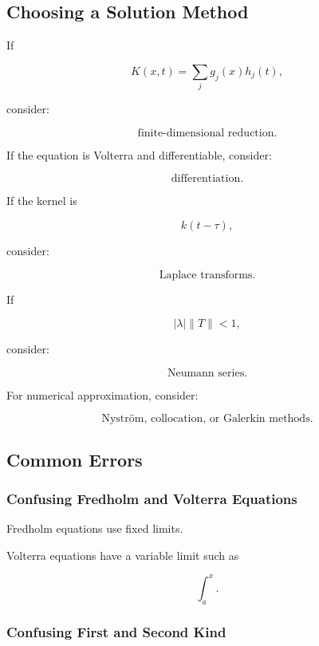 \subsection{Choosing a Solution Method}
\label{subsec:choosing-integral-equation-method}

If

\[
K(x,t)
=
\sum_j
g_j(x)h_j(t),
\]

consider:

\[
\boxed{
\text{finite-dimensional reduction}.
}
\]

If the equation is Volterra and differentiable, consider:

\[
\boxed{
\text{differentiation}.
}
\]

If the kernel is

\[
k(t-\tau),
\]

consider:

\[
\boxed{
\text{Laplace transforms}.
}
\]

If

\[
|\lambda|\|T\|<1,
\]

consider:

\[
\boxed{
\text{Neumann series}.
}
\]

For numerical approximation, consider:

\[
\boxed{
\text{Nystr\"om, collocation, or Galerkin methods}.
}
\]

\subsection{Common Errors}
\label{subsec:integral-equation-common-errors}

\subsubsection{Confusing Fredholm and Volterra Equations}

Fredholm equations use fixed limits.

Volterra equations have a variable limit such as

\[
\boxed{
\int_a^x.
}
\]

\subsubsection{Confusing First and Second Kind}

